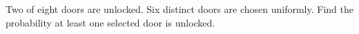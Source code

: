 Two of eight doors are unlocked. Six distinct doors are chosen uniformly. Find the probability at least one selected door is unlocked.
